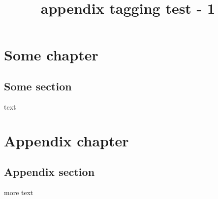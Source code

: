 \documentclass{report}
\title{appendix tagging test - 1}
\begin{document}
\tableofcontents

\chapter{Some chapter}
\section{Some section}
text
\appendix
\appendixpage
\addappheadtotoc
\chapter{Appendix chapter}
\section{Appendix section}
more text
\end{document}
